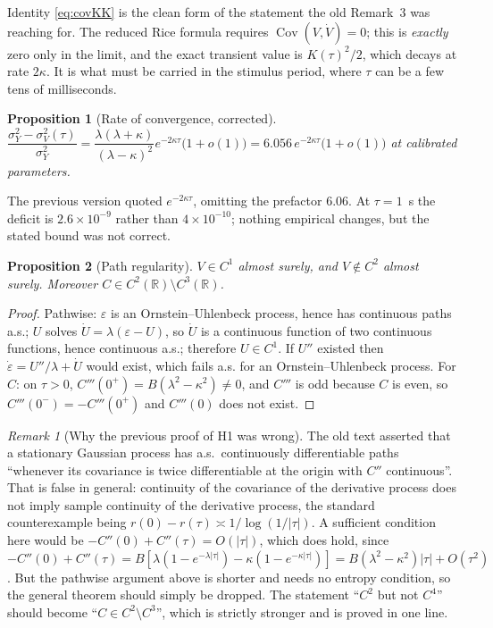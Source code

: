 \documentclass[11pt,a4paper]{article}
\newcommand{\Cov}{\operatorname{Cov}}
\theoremstyle{plain}
\newtheorem{proposition}{Proposition}
\theoremstyle{remark}
\newtheorem{remark}{Remark}
\begin{document}
Identity \eqref{eq:covKK} is the clean form of the statement the old Remark~3 was
reaching for. The reduced Rice formula requires $\Cov(V,\dot V)=0$; this is
\emph{exactly} zero only in the limit, and the exact transient value is $K(\tau)^2/2$,
which decays at rate $2\kappa$. It is what must be carried in the stimulus period, where
$\tau$ can be a few tens of milliseconds.

\begin{proposition}[Rate of convergence, corrected]
\label{prop:conv}
$\dfrac{\sigma_Y^2-\sigma_V^2(\tau)}{\sigma_Y^2}
=\dfrac{\lambda(\lambda+\kappa)}{(\lambda-\kappa)^2}e^{-2\kappa\tau}\bigl(1+o(1)\bigr)
=6.056\,e^{-2\kappa\tau}\bigl(1+o(1)\bigr)$ at calibrated parameters.
\end{proposition}

The previous version quoted $e^{-2\kappa\tau}$, omitting the prefactor $6.06$. At
$\tau=1$~s the deficit is $2.6\times10^{-9}$ rather than $4\times10^{-10}$; nothing
empirical changes, but the stated bound was not correct.

\begin{proposition}[Path regularity]
\label{prop:C1}
$V\in C^1$ almost surely, and $V\notin C^2$ almost surely. Moreover
$C\in C^2(\mathbb R)\setminus C^3(\mathbb R)$.
\end{proposition}

\begin{proof}
Pathwise: $\varepsilon$ is an Ornstein--Uhlenbeck process, hence has continuous paths a.s.;
$U$ solves $\dot U=\lambda(\varepsilon-U)$, so $\dot U$ is a continuous function of two
continuous functions, hence continuous a.s.; therefore $U\in C^1$. If $U''$ existed then
$\dot\varepsilon=U''/\lambda+\dot U$ would exist, which fails a.s. for an
Ornstein--Uhlenbeck process. For $C$: on $\tau>0$,
$C'''(0^{+})=B(\lambda^2-\kappa^2)\neq0$, and $C'''$ is odd because $C$ is even, so
$C'''(0^{-})=-C'''(0^{+})$ and $C'''(0)$ does not exist.
\end{proof}

\begin{remark}[Why the previous proof of H1 was wrong]
The old text asserted that a stationary Gaussian process has a.s.\ continuously
differentiable paths ``whenever its covariance is twice differentiable at the origin with
$C''$ continuous''. That is false in general: continuity of the covariance of the
derivative process does not imply sample continuity of the derivative process, the
standard counterexample being $r(0)-r(\tau)\asymp1/\log(1/|\tau|)$. A sufficient condition
here would be $-C''(0)+C''(\tau)=O(|\tau|)$, which does hold, since
$-C''(0)+C''(\tau)=B[\lambda(1-e^{-\lambda|\tau|})-\kappa(1-e^{-\kappa|\tau|})]
=B(\lambda^2-\kappa^2)|\tau|+O(\tau^2)$. But the pathwise argument above is shorter and
needs no entropy condition, so the general theorem should simply be dropped.
The statement ``$C^2$ but not $C^4$'' should become ``$C\in C^2\setminus C^3$'', which is
strictly stronger and is proved in one line.
\end{remark}
\end{document}
